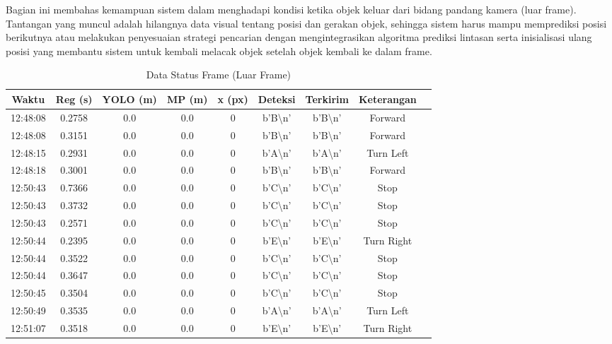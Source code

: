 Bagian ini membahas kemampuan sistem dalam menghadapi kondisi ketika objek keluar dari bidang pandang kamera (luar frame). Tantangan yang muncul adalah hilangnya data visual tentang posisi dan gerakan objek, sehingga sistem harus mampu memprediksi posisi berikutnya atau melakukan penyesuaian strategi pencarian dengan mengintegrasikan algoritma prediksi lintasan serta inisialisasi ulang posisi yang membantu sistem untuk kembali melacak objek setelah objek kembali ke dalam frame.
\begin{table}[H]
    \centering
    \caption{Data Status Frame (Luar Frame)}
    \label{tab:status_luar_frame}
    \begin{tabular}{|c|c|c|c|c|c|c|c|c|}
    \hline
    Waktu & Reg (s) & YOLO (m) & MP (m) & x (px) & Deteksi & Terkirim & Keterangan \\ \hline
    12:48:08 & 0.2758 & 0.0 & 0.0 & 0 & b'B\textbackslash n' & b'B\textbackslash n' & Forward \\ \hline
    12:48:08 & 0.3151 & 0.0 & 0.0 & 0 & b'B\textbackslash n' & b'B\textbackslash n' & Forward \\ \hline
    12:48:15 & 0.2931 & 0.0 & 0.0 & 0 & b'A\textbackslash n' & b'A\textbackslash n' & Turn Left \\ \hline
    12:48:18 & 0.3001 & 0.0 & 0.0 & 0 & b'B\textbackslash n' & b'B\textbackslash n' & Forward \\ \hline
    12:50:43 & 0.7366 & 0.0 & 0.0 & 0 & b'C\textbackslash n' & b'C\textbackslash n' & Stop \\ \hline
    12:50:43 & 0.3732 & 0.0 & 0.0 & 0 & b'C\textbackslash n' & b'C\textbackslash n' & Stop \\ \hline
    12:50:43 & 0.2571 & 0.0 & 0.0 & 0 & b'C\textbackslash n' & b'C\textbackslash n' & Stop \\ \hline
    12:50:44 & 0.2395 & 0.0 & 0.0 & 0 & b'E\textbackslash n' & b'E\textbackslash n' & Turn Right \\ \hline
    12:50:44 & 0.3522 & 0.0 & 0.0 & 0 & b'C\textbackslash n' & b'C\textbackslash n' & Stop \\ \hline
    12:50:44 & 0.3647 & 0.0 & 0.0 & 0 & b'C\textbackslash n' & b'C\textbackslash n' & Stop \\ \hline
    12:50:45 & 0.3504 & 0.0 & 0.0 & 0 & b'C\textbackslash n' & b'C\textbackslash n' & Stop \\ \hline
    12:50:49 & 0.3535 & 0.0 & 0.0 & 0 & b'A\textbackslash n' & b'A\textbackslash n' & Turn Left \\ \hline
    12:51:07 & 0.3518 & 0.0 & 0.0 & 0 & b'E\textbackslash n' & b'E\textbackslash n' & Turn Right \\ \hline

\end{tabular}
\end{table}
